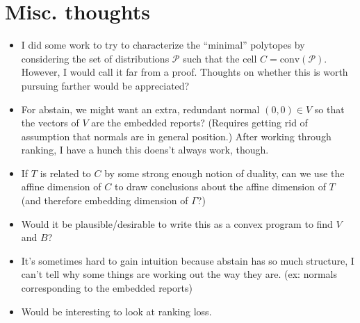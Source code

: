 \documentclass[12pt]{article}
\renewcommand{\P}{\mathcal{P}}
\newcommand{\conv}{\mathrm{conv}}
\begin{document}
\section{Misc. thoughts}
\begin{itemize}
	\item I did some work to try to characterize the ``minimal'' polytopes by considering the set of distributions $\P$ such that the cell $C = \conv(\P)$.
	However, I would call it far from a proof.
	Thoughts on whether this is worth pursuing farther would be appreciated?
	
	\item For abstain, we might want an extra, redundant normal $(0,0) \in V$ so that the vectors of $V$ are the embedded reports?  
	(Requires getting rid of assumption that normals are in general position.)
	After working through ranking, I have a hunch this doens't always work, though.
	
	\item If $T$ is related to $C$ by some strong enough notion of duality, can we use the affine dimension of $C$ to draw conclusions about the affine dimension of $T$ (and therefore embedding dimension of $\Gamma$?) 
	
	\item Would it be plausible/desirable to write this as a convex program to find $V$ and $B$?

	\item It's sometimes hard to gain intuition because abstain has so much structure, I can't tell why some things are working out the way they are. (ex: normals corresponding to the embedded reports)
	
	\item Would be interesting to look at ranking loss.
	
\end{itemize}
\end{document}
